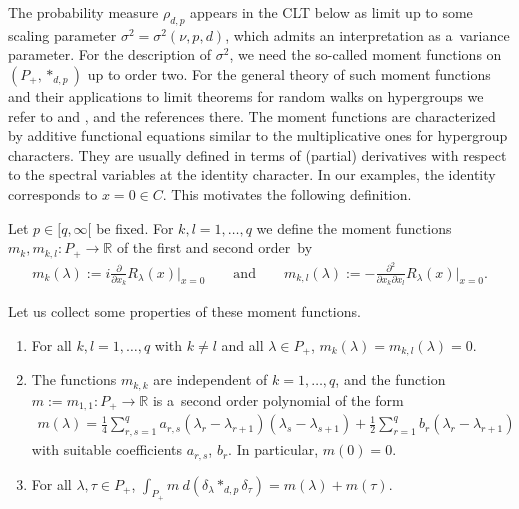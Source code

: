 The probability measure $\rho_{d,p}$ appears in the CLT below as limit up to some scaling parameter
$\sigma^2=\sigma^2(\nu,p,d)$, which admits an interpretation as a~variance parameter.
For the description of $\sigma^2$, we need the so-called moment functions on $(P_+,*_{d,p})$ up to order two.
For the general theory of such moment functions and their applications to limit theorems for random walks on hypergroups
we refer to \cite[Chapter~7]{BH} and \cite{Z}, and the references there.
The moment functions are characterized by additive functional equations similar to the multiplicative ones for
hypergroup characters.
They are usually def\/ined in terms of (partial) derivatives with respect to the spectral variables at the identity
character.
In our examples, the identity corresponds to $x=0\in C$.
This motivates the following def\/inition.

\begin{Definition}
Let $p\in[q,\infty[$ be f\/ixed.
For $k,l=1,\ldots,q$ we def\/ine the moment functions $m_k, m_{k,l}: P_+\to\mathbb R$ of the f\/irst and second order~by
\begin{gather*}
m_k(\lambda):= i  \frac{\partial}{\partial x_k} R_\lambda(x)\bigg|_{x=0}
\qquad
\text{and}
\qquad
m_{k,l}(\lambda):= -\frac{\partial^2}{\partial x_k\partial x_l} R_\lambda(x)\bigg|_{x=0}.
\end{gather*}
\end{Definition}

\noindent Let us collect some properties of these moment functions.

\begin{Lemma}\label{basic-prop-moment}\quad
\begin{enumerate}\itemsep=0pt
\item[$(1)$]
For all $k,l=1,\ldots,q$ with $k\ne l$ and all $\lambda\in P_+$, $m_k(\lambda)= m_{k,l}(\lambda)=0$.
\item[$(2)$]
The functions $m_{k,k}$ are independent of $k=1,\ldots,q$, and the function $m:=m_{1,1}: P_+\to\mathbb
R$ is a~second order polynomial of the form
\begin{gather*}
m(\lambda)
=\frac{1}{4}\sum\limits_{r,s=1}^q a_{r,s}
 (\lambda_r-\lambda_{r+1})(\lambda_s-\lambda_{s+1}) +\frac{1}{2} \sum\limits_{r=1}^q b_r (\lambda_r-\lambda_{r+1})
\end{gather*}
with suitable coefficients $a_{r,s}$, $b_r$.
In particular, $m(0)=0$.
\item[$(3)$]
For all $\lambda,\tau\in P_+$, $\int_{P_+} m\> d(\delta_\lambda*_{d,p}\delta_\tau)= m(\lambda)+m(\tau)$.
\end{enumerate}
\end{Lemma}

